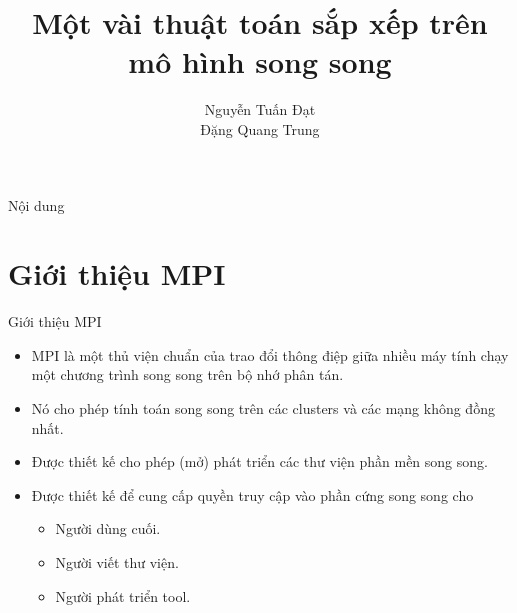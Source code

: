 \documentclass{beamer}
\title[]{{\huge \bf Một vài thuật toán sắp xếp trên mô hình song song} \\}
\author[]{
Nguyễn Tuấn Đạt\\
Đặng Quang Trung\\
}
\institute[]{
}
\newcommand{\bi}{\begin{itemize}}
\newcommand{\ei}{\end{itemize}}
\begin{document}
\begin{frame}
\titlepage
\end{frame}

\begin{frame}{Nội dung}
\tableofcontents
\end{frame}
\section{Giới thiệu MPI}
\begin{frame}{Giới thiệu MPI}
\bi
\item MPI là một thủ viện chuẩn của trao đổi thông điệp giữa nhiều máy tính chạy một chương trình song song trên bộ nhớ phân tán.
\item Nó cho phép tính toán song song trên các clusters và các mạng không đồng nhất.
\item Được thiết kế cho phép (mở) phát triển các thư viện phần mền song song.
\item Được thiết kế để cung cấp quyền truy cập vào phần cứng song song cho 
\bi
\item Người dùng cuối.
\item Người viết thư viện.
\item Người phát triển tool.
\ei
\ei
\end{frame}
\end{document}
